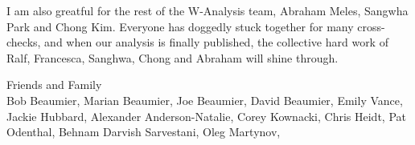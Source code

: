 I am also greatful for the rest of the W-Analysis team, Abraham Meles, Sangwha
Park and Chong Kim. Everyone has doggedly stuck together for many cross-checks,
and when our analysis is finally published, the collective hard work of Ralf,
Francesca, Sanghwa, Chong and Abraham will shine through.

Friends and Family \\
  Bob Beaumier, 
  Marian Beaumier, 
  Joe Beaumier, 
  David Beaumier, 
  Emily Vance, 
  Jackie Hubbard, 
  Alexander Anderson-Natalie, 
  Corey Kownacki, 
  Chris Heidt, 
  Pat Odenthal, 
  Behnam Darvish Sarvestani, 
  Oleg Martynov, 
